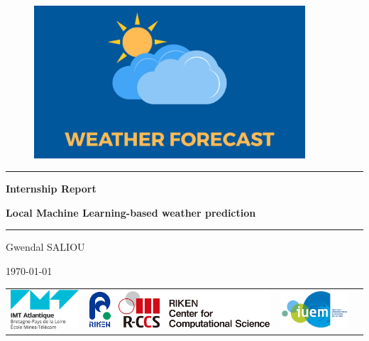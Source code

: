 \begin{titlepage}

\centering
\begin{figure}[ht]
    \centering           \includegraphics[width=0.9\textwidth]{media/weather-forecast.png}
\end{figure}

\vspace{-0.5cm}

\begin{center}
    \rule{\linewidth}{0.5pt} %
    \vspace{0.5cm}
    {\Large\bfseries Internship Report \par}
    {\Large\bfseries Local Machine Learning-based weather prediction \par}
    \rule{\linewidth}{0.5pt} %
\end{center}

\vspace{0.5cm}

{\large Gwendal SALIOU \par}
{\large\today\par}

\vfill
\begin{tabular}{cccc}
    \includegraphics[width=3cm]{media/logo_IMT.png} \hspace{1cm} &
    \includegraphics[width=8cm]{media/logo_riken.png} \hspace{1cm} &
    \includegraphics[width=3cm]{media/logo_IUEM.png} \\
\end{tabular}
\null

\end{titlepage}